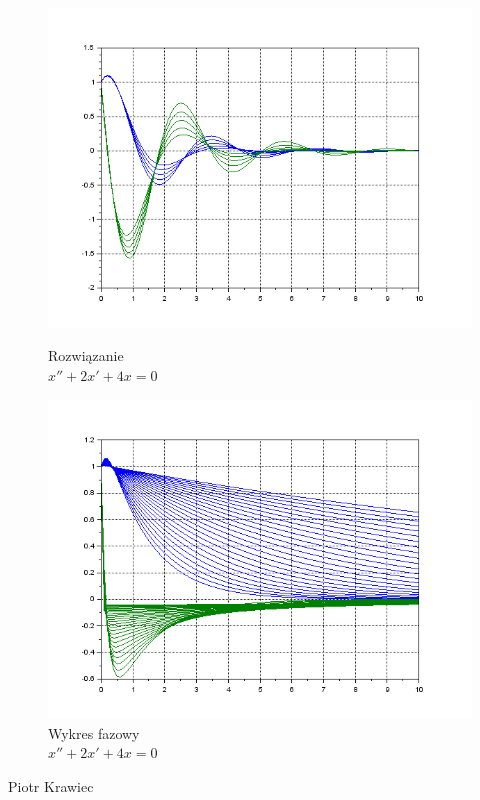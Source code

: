\documentclass[12pt]{article}
\begin{document}
\begin{figure}[H]
  \centering
  \hspace{-1.6cm}
  \begin{minipage}[b]{0.49\textwidth}
    \includegraphics[scale=0.47]{./img/5-zespolone-xy-11}
    \caption{Rozwiązanie \\ \centering $x''+2x'+4x=0$}
  \end{minipage}
  \hfill
  \begin{minipage}[b]{0.49\textwidth}
    \includegraphics[scale=0.47]{./img/5-rzeczywiste-xy-11}
    \caption{Wykres fazowy \\
    \centering $x''+2x'+4x=0$}
  \end{minipage}
\end{figure}

\null\hfill Piotr Krawiec
\end{document}
